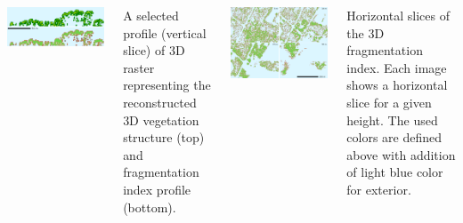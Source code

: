 \documentclass[25pt, margin=0mm, innermargin=15mm, blockverticalspace=15mm, colspace=15mm, subcolspace=8mm]{tikzposter}
\begin{document}
\begin{columns}
{\vspace{4ex}

\begin{center}
\includegraphics[width=\linewidth]{profiles}
\end{center}

A selected profile (vertical slice) of 3D raster representing
the reconstructed 3D vegetation structure (top)
and fragmentation index profile (bottom).



\vspace{4ex}

\begin{center}
\includegraphics[width=\linewidth]{hslice}
\end{center}

Horizontal slices of the 3D fragmentation index.
Each image shows a horizontal slice for a given height.
The used colors are defined above with addition of light blue color for exterior.



}
\end{columns}
\end{document}
